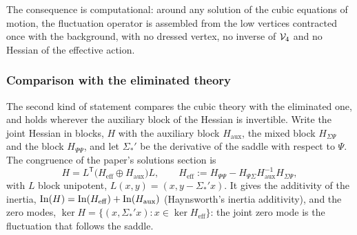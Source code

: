 The consequence is computational: around any solution of the cubic equations of motion, the fluctuation operator is assembled from the low vertices contracted once with the background, with no dressed vertex, no inverse of $\mathcal{V}_{4}$ and no Hessian of the effective action.

\subsubsection{Comparison with the eliminated theory}
\label{fdm:sec:hessian:congruence}

The second kind of statement compares the cubic theory with the eliminated one, and holds wherever the auxiliary block of the Hessian is invertible.
Write the joint Hessian in blocks, $H$ with the auxiliary block $H_{\mathrm{aux}}$, the mixed block $H_{\Sigma \Psi}$ and the block $H_{\Psi \Psi}$, and let $\Sigma_*'$ be the derivative of the saddle with respect to $\Psi$.
The congruence of the paper's solutions section is
\begin{equation}
  \label{fdm:eq:hessian:congruence}
  H
    = L^{\mathsf T} \big( H_{\mathrm{eff}} \oplus H_{\mathrm{aux}} \big) L,
  \qquad
  H_{\mathrm{eff}}
    := H_{\Psi \Psi} - H_{\Psi \Sigma} H_{\mathrm{aux}}^{-1} H_{\Sigma \Psi},
\end{equation}
with $L$ block unipotent, $L(x, y) = (x, y - \Sigma_*' x)$.
It gives the additivity of the inertia, $\operatorname{In}(H) = \operatorname{In}(H_{\mathrm{eff}}) + \operatorname{In}(H_{\mathrm{aux}})$ (Haynsworth's inertia additivity), and the zero modes, $\ker H = \{ (x, \Sigma_*' x) : x \in \ker H_{\mathrm{eff}} \}$: the joint zero mode is the fluctuation that follows the saddle.

